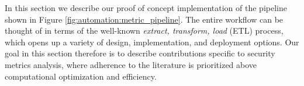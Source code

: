 





In this section we describe our proof of concept implementation of the pipeline shown in Figure \ref{fig:automation:metric_pipeline}. The entire workflow can be thought of in terms of the well-known \textit{extract, transform, load} (ETL) process, which opens up a variety of design, implementation, and deployment options. Our goal in this section therefore is to describe contributions specific to security metrics analysis, where adherence to the literature is prioritized above computational optimization and efficiency. 

